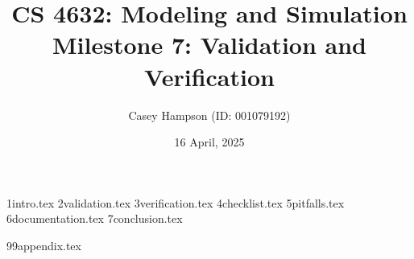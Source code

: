 \documentclass[titlepage]{article}
\title{CS 4632: Modeling and Simulation \\[5pt] Milestone 7: Validation and Verification}
\author{Casey Hampson (ID: 001079192)}
\date{16 April, 2025}
\begin{document}
    \maketitle
    \pagebreak
    \tableofcontents
    \pagebreak

    {1intro.tex}
    {2validation.tex}
    {3verification.tex}
    {4checklist.tex}
    {5pitfalls.tex}
    {6documentation.tex}
    {7conclusion.tex}

    \pagebreak
    {99appendix.tex}
    \pagebreak
    
    \printbibliography
\end{document}
